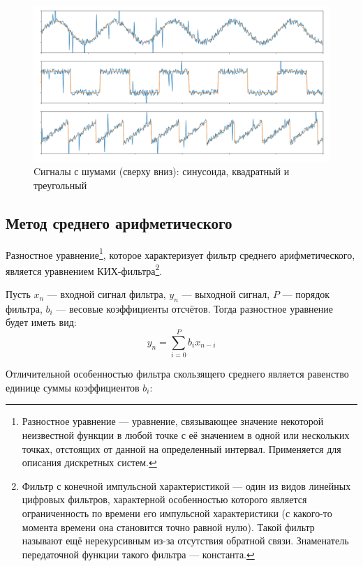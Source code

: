 \begin{figure}[h]
	\begin{center}
		\includegraphics[pages=-, scale=0.22]{./inc/img/2.png}
		\caption{Cигналы с шумами (сверху вниз): синусоида, квадратный и треугольный}  
		\label{img_2}
	\end{center}
\end{figure}

\newpage

\subsection{Метод среднего арифметического}

Разностное уравнение\footnote{Разностное уравнение --- уравнение, связывающее значение некоторой неизвестной функции в любой точке с её значением в одной или нескольких точках, отстоящих от данной на определенный интервал. Применяется для описания дискретных систем.}, которое характеризует фильтр среднего арифметического, является уравнением КИХ-фильтра\footnote{Фильтр с конечной импульсной характеристикой — один из видов линейных цифровых фильтров, характерной особенностью которого является ограниченность по времени его импульсной характеристики (с какого-то момента времени она становится точно равной нулю). Такой фильтр называют ещё нерекурсивным из-за отсутствия обратной связи. Знаменатель передаточной функции такого фильтра --- константа.}. \cite{avg1}

Пусть $x_n$ --- входной сигнал фильтра, $y_n$ --- выходной сигнал, $P$ --- порядок фильтра, $b_i$ --- весовые коэффициенты отсчётов. Тогда разностное уравнение будет иметь вид:
\begin{equation}
	y_n = \sum_{i=0}^{P} b_i x_{n-i}
\end{equation}

Отличительной особенностью фильтра скользящего среднего является равенство единице суммы коэффициентов $b_i$:


